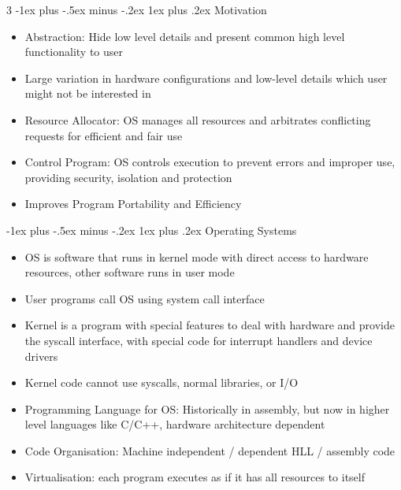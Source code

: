 \documentclass[10pt, landscape]{article}
\makeatletter
\renewcommand{\subsection}{\@startsection{subsection}{3}{0mm}%
                                {-1ex plus -.5ex minus -.2ex}%
                                {1ex plus .2ex}%
                                {\normalfont\small\bfseries}}%
\makeatother
\begin{document}
\begin{multicols*}{3}
\subsection{Motivation}
\begin{itemize}
    \item Abstraction: Hide low level details and present common high level functionality to user
    \item Large variation in hardware configurations and low-level details which user might not be interested in
    \item Resource Allocator: OS manages all resources and arbitrates conflicting requests for efficient and fair use
    \item Control Program: OS controls execution to prevent errors and improper use, providing security, isolation and protection
    \item Improves Program Portability and Efficiency
\end{itemize}

\subsection{Operating Systems}
\begin{itemize}
    \item OS is software that runs in kernel mode with direct access to hardware resources, other software runs in user mode
    \item User programs call OS using system call interface
    \item Kernel is a program with special features to deal with hardware and provide the syscall interface, with special code for interrupt handlers and device drivers
    \item Kernel code cannot use syscalls, normal libraries, or I/O
    \item Programming Language for OS: Historically in assembly, but now in higher level languages like C/C++, hardware architecture dependent
    \item Code Organisation: Machine independent / dependent HLL / assembly code
    \item Virtualisation: each program executes as if it has all resources to itself
\end{itemize}


\end{multicols*}
\end{document}
